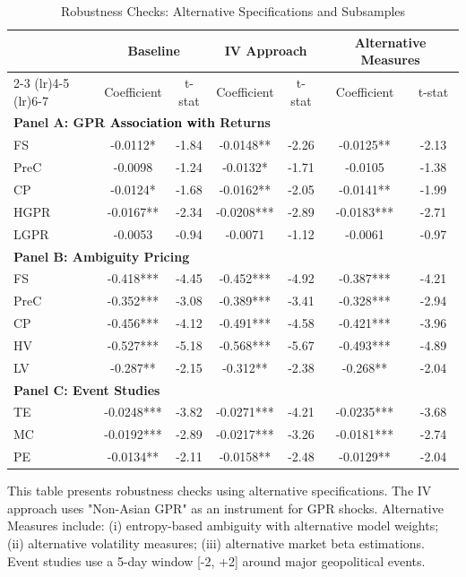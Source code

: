 \documentclass[preprint,12pt,authoryear]{elsarticle}
\begin{document}
\begin{table}[htbp]
\centering
\caption{Robustness Checks: Alternative Specifications and Subsamples}
\label{tab:robustness}
\begin{threeparttable}
\begin{tabular*}{\textwidth}{@{\extracolsep{\fill}} lcccccc @{\extracolsep{\fill}}}
\toprule
& \multicolumn{2}{c}{Baseline} & \multicolumn{2}{c}{IV Approach} & \multicolumn{2}{c}{Alternative Measures} \\
\cmidrule(lr){2-3} \cmidrule(lr){4-5} \cmidrule(lr){6-7}
& Coefficient & t-stat & Coefficient & t-stat & Coefficient & t-stat \\
\midrule
\midrule
\multicolumn{7}{l}{\textbf{Panel A: GPR \textcolor{black}{Association with} Returns}} \\
FS & -0.0112* & -1.84 & -0.0148** & -2.26 & -0.0125** & -2.13 \\
PreC & -0.0098 & -1.24 & -0.0132* & -1.71 & -0.0105 & -1.38 \\
CP & -0.0124* & -1.68 & -0.0162** & -2.05 & -0.0141** & -1.99 \\
HGPR & -0.0167** & -2.34 & -0.0208*** & -2.89 & -0.0183*** & -2.71 \\
LGPR & -0.0053 & -0.94 & -0.0071 & -1.12 & -0.0061 & -0.97 \\
\midrule
\multicolumn{7}{l}{\textbf{Panel B: Ambiguity Pricing}} \\
FS & -0.418*** & -4.45 & -0.452*** & -4.92 & -0.387*** & -4.21 \\
PreC & -0.352*** & -3.08 & -0.389*** & -3.41 & -0.328*** & -2.94 \\
CP & -0.456*** & -4.12 & -0.491*** & -4.58 & -0.421*** & -3.96 \\
HV & -0.527*** & -5.18 & -0.568*** & -5.67 & -0.493*** & -4.89 \\
LV & -0.287** & -2.15 & -0.312** & -2.38 & -0.268** & -2.04 \\
\midrule
\multicolumn{7}{l}{\textbf{Panel C: Event Studies}} \\
TE & -0.0248*** & -3.82 & -0.0271*** & -4.21 & -0.0235*** & -3.68 \\
MC & -0.0192*** & -2.89 & -0.0217*** & -3.26 & -0.0181*** & -2.74 \\
PE & -0.0134** & -2.11 & -0.0158** & -2.48 & -0.0129** & -2.04 \\
\bottomrule
\end{tabular*}
\begin{tablenotes}[flushleft]
\small
\item[] This table presents robustness checks using alternative specifications. The IV approach uses "Non-Asian GPR" as an instrument for GPR shocks. Alternative Measures include: (i) entropy-based ambiguity with alternative model weights; (ii) alternative volatility measures; (iii) alternative market beta estimations. Event studies use a 5-day window [-2, +2] around major geopolitical events.

\end{tablenotes}
\end{threeparttable}
\end{table}
\end{document}
